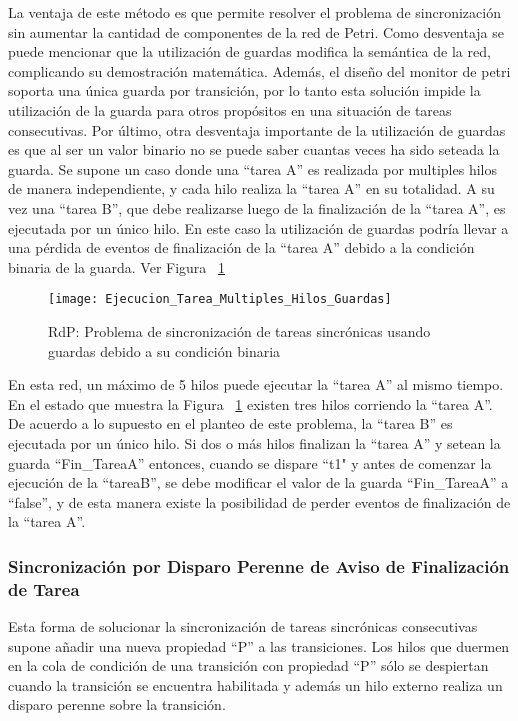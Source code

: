 La ventaja de este método es que permite resolver el problema de sincronización
sin aumentar la cantidad de componentes de la red de Petri.
Como desventaja se puede mencionar que la utilización de guardas modifica la
semántica de la red, complicando su demostración matemática. Además, el diseño del monitor de
petri soporta una única guarda por transición, por lo tanto esta solución impide
la utilización de la guarda para otros propósitos en una situación de tareas
consecutivas. Por último, otra desventaja importante de la utilización de
guardas es que al ser un valor binario no se puede saber cuantas veces ha sido seteada
la guarda.
Se supone un caso donde una ``tarea A'' es realizada por multiples hilos de manera
independiente, y cada hilo realiza la ``tarea A'' en su totalidad. A su
vez una ``tarea B'', que debe realizarse luego de la finalización de la ``tarea
A'', es ejecutada por un único hilo. En este caso la utilización de guardas
podría llevar a una pérdida de eventos de finalización de la ``tarea A'' debido
a la condición binaria de la guarda. Ver Figura ~\ref{fig:ejecucion_multiples_hilos_guardas}

\begin{figure}[H]
    \centering
    \texttt{[image: Ejecucion\_Tarea\_Multiples\_Hilos\_Guardas]}
    \caption{RdP: Problema de sincronización de tareas sincrónicas usando
    guardas debido a su condición binaria}
    \label{fig:ejecucion_multiples_hilos_guardas}
\end{figure}

En esta red, un máximo de 5 hilos puede ejecutar la ``tarea A'' al mismo
tiempo. En el estado que  muestra la Figura
~\ref{fig:ejecucion_multiples_hilos_guardas} existen tres hilos corriendo la
``tarea A''. De acuerdo a lo supuesto en el planteo de este problema, la ``tarea
B'' es ejecutada por un único hilo. Si dos o más hilos finalizan la ``tarea A''
y setean la guarda ``Fin\_TareaA'' entonces, cuando se dispare ``t1" y antes de
comenzar la ejecución de la ``tareaB'', se debe modificar el valor de la guarda
``Fin\_TareaA'' a ``false'', y de esta manera existe la posibilidad de perder
eventos de finalización de la ``tarea A''.

\subsubsection{Sincronización por Disparo Perenne de Aviso de
Finalización de Tarea}
Esta forma de solucionar la sincronización de tareas sincrónicas consecutivas
supone añadir una nueva propiedad ``P'' a las transiciones. Los hilos que
duermen en la cola de condición de una transición con propiedad ``P'' sólo
se despiertan cuando la transición se encuentra habilitada y además un hilo
externo realiza un disparo perenne sobre la transición.

